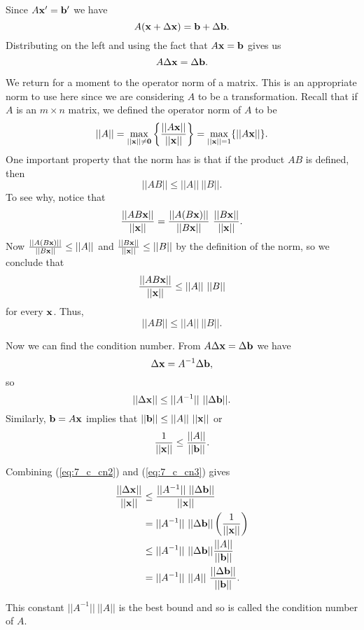 Since $A \mathbf{x}' = \mathbf{b}'$ we have
\begin{equation*}
A(\mathbf{x} + \Delta \mathbf{x}) = \mathbf{b} + \Delta \mathbf{b}.
\end{equation*}
Distributing on the left and using the fact that $A\mathbf{x} = \mathbf{b}$ gives us
\begin{equation*}
A\Delta \mathbf{x} = \Delta \mathbf{b}. \label{eq:7_c_cn}
\end{equation*}

We return for a moment to the operator norm of a matrix. This is an appropriate norm to use here since we are considering $A$ to be a transformation. Recall that if $A$ is an $m \times n$ matrix, we defined the operator norm of $A$ to be
\[||A|| = \max_{||\mathbf{x}|| \neq \mathbf{0}} \left\{\frac{||A\mathbf{x}||}{||\mathbf{x}||} \right\} = \max_{||\mathbf{x}||=1} \{||A\mathbf{x}||\}.\]
One important property that the norm has is that if the product $AB$ is defined, then
\[||AB|| \leq ||A|| \ ||B||.\]
To see why, notice that
\[\frac{||AB\mathbf{x}||}{||\mathbf{x}||} = \frac{||A(B\mathbf{x})||}{||B\mathbf{x}||} \ \frac{||B\mathbf{x}||}{||\mathbf{x}||}.\]
Now $\frac{||A(B\mathbf{x})||}{||B\mathbf{x}||} \leq ||A||$ and $\frac{||B\mathbf{x}||}{||\mathbf{x}||} \leq ||B||$ by the definition of the norm, so we conclude that
\[\frac{||AB\vx||}{||\vx||} \leq ||A|| \ ||B||\]
for every $\mathbf{x}$. Thus,
\[||AB|| \leq ||A|| \ ||B||.\]

Now we can find the condition number. From $A \Delta \mathbf{x} = \Delta \mathbf{b}$ we have
\[\Delta \mathbf{x} = A^{-1} \Delta \mathbf{b},\]
so
\begin{equation}
||\Delta \mathbf{x}|| \leq ||A^{-1}|| \ ||\Delta \mathbf{b}||. \label{eq:7_c_cn2}
\end{equation}
Similarly, $\mathbf{b} = A\mathbf{x}$ implies that $||\mathbf{b}|| \leq ||A|| \ ||\mathbf{x}||$ or
\begin{equation}
\frac{1}{||\mathbf{x}||} \leq \frac{||A||}{||\mathbf{b}||}. \label{eq:7_c_cn3}
\end{equation}

Combining (\ref{eq:7_c_cn2}) and (\ref{eq:7_c_cn3}) gives
\begin{align*}
\frac{||\Delta \mathbf{x}||}{||\mathbf{x}||} &\leq \frac{||A^{-1}|| \ ||\Delta \mathbf{b}||}{||\mathbf{x}||} \\
	&= ||A^{-1}|| \ ||\Delta \mathbf{b}|| \left(\frac{1}{||\mathbf{x}||}\right) \\
	&\leq ||A^{-1}|| \ ||\Delta \mathbf{b}||  \frac{||A||}{||\mathbf{b}||} \\
	&= ||A^{-1}|| \ ||A|| \ \frac{||\Delta \mathbf{b}||}{||\mathbf{b}||}.
\end{align*}

This constant $||A^{-1}|| \ ||A||$ is the best bound and so is called the condition number of $A$.

